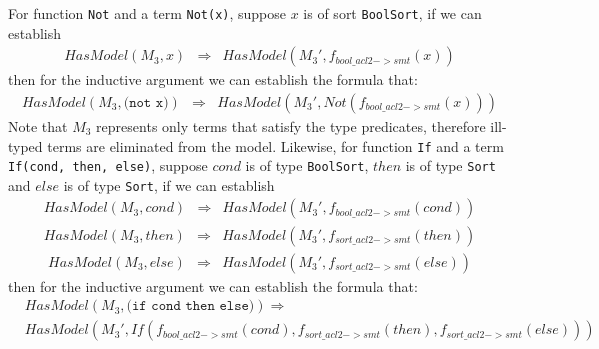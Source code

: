 For function \texttt{Not} and a term \texttt{Not(x)}, suppose $x$ is of sort
\texttt{BoolSort}, if we can establish
\begin{equation}\label{eq:boolsortnotbase}\begin{array}{rcl}
HasModel(M_3, x) &\Rightarrow& HasModel(M_3', f_{bool\_acl2->smt}(x))
\end{array}\end{equation}
then for the inductive argument we can establish the formula that:
\begin{equation}\label{eq:boolsortnotinductive}\begin{array}{rcl}
HasModel(M_3, \texttt{(not x)}) &\Rightarrow& HasModel(M_3', Not(f_{bool\_acl2->smt}(x)))
\end{array}\end{equation}
Note that $M_3$ represents only terms that satisfy the type predicates,
therefore ill-typed terms are eliminated from the model. Likewise, for function
\texttt{If} and a term \texttt{If(cond, then, else)}, suppose $cond$ is of type
\texttt{BoolSort}, $then$ is of type \texttt{Sort} and $else$ is of type
\texttt{Sort}, if we can establish
\begin{equation}\label{eq:boolsortifbase1}\begin{array}{rcl}
HasModel(M_3, cond) &\Rightarrow& HasModel(M_3', f_{bool\_acl2->smt}(cond))
\end{array}\end{equation}
\begin{equation}\label{eq:boolsortifbase2}\begin{array}{rcl}
HasModel(M_3, then) &\Rightarrow& HasModel(M_3', f_{sort\_acl2->smt}(then))
\end{array}\end{equation}
\begin{equation}\label{eq:boolsortifbase3}\begin{array}{rcl}
HasModel(M_3, else) &\Rightarrow& HasModel(M_3', f_{sort\_acl2->smt}(else))
\end{array}\end{equation}
then for the inductive argument we can establish the formula that:
\begin{equation}\label{eq:boolsortifinductive}
\begin{array}{rcl}
  &HasModel(M_3, \texttt{(if cond then else)}) \Rightarrow \\
  &HasModel(M_3', If(f_{bool\_acl2->smt}(cond), f_{sort\_acl2->smt}(then), f_{sort\_acl2->smt}(else)))
\end{array}
\end{equation}

